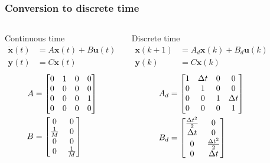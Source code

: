 \begin{frame} 
	\frametitle{Conversion to discrete time}
	\begin{columns}[onlytextwidth]
		\begin{block}{Continuous time}
			\vspace*{-1em}
			\begin{align*}
			\dot{\bm{x}}(t) &= A \bm{x}(t) + B \bm{u}(t)\\
			\bm{y}(t) &= C \bm{x}(t) 
			\end{align*}
			\vspace*{-2em}
			\begin{align*}
			A&=
			\begin{bmatrix}0&1&0&0\\0&0&0&0\\0&0&0&1\\0&0&0&0\end{bmatrix}
			\\
			B&=\begin{bmatrix}0&0\\ \frac{1}{M} &0\\0&0 \\0&\frac{1}{M}\end{bmatrix}
			\end{align*}
		\end{block}
		\centering
		\begin{block}{Discrete time \footnotemark}
			\vspace*{-1em}
			\begin{align*}
			\bm{x}(k+1) &= A_d \bm{x}(k) + B_d \bm{u}(k)\\
			\bm{y}(k) &= C \bm{x}(k) 
			\end{align*}
			\vspace*{-2em}
			\begin{align*}
			A_d&=\begin{bmatrix}1&\Delta t&0&0\\0&1&0&0\\0&0&1&\Delta t\\0&0&0&1\end{bmatrix}
			\\
			B_d&=\begin{bmatrix}\frac{\Delta t^2}{2}&0\\ \Delta t &0\\0&\frac{\Delta t^2}{2} \\0&\Delta t\end{bmatrix}
			\end{align*}
		\end{block}
	\end{columns}
\end{frame}

